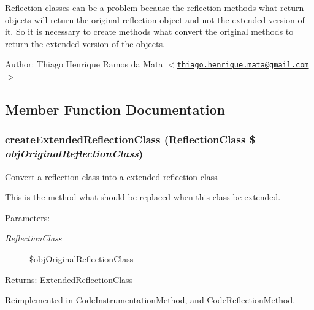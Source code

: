 Reflection classes can be a problem because the reflection methods what return objects will return the original reflection object and not the extended version of it. So it is necessary to create methods what convert the original methods to return the extended version of the objects.

\begin{Desc}
\item[Author:]Thiago Henrique Ramos da Mata $<$\href{mailto:thiago.henrique.mata@gmail.com}{\tt thiago.henrique.mata@gmail.com}$>$ \end{Desc}


\subsection{Member Function Documentation}
\hypertarget{class_extended_reflection_method_6b56ec198bc6a5b5a72076e4e7c19e29}{
\subsubsection[{createExtendedReflectionClass}]{\setlength{\rightskip}{0pt plus 5cm}createExtendedReflectionClass (ReflectionClass \$ {\em objOriginalReflectionClass})}}
\label{class_extended_reflection_method_6b56ec198bc6a5b5a72076e4e7c19e29}


Convert a reflection class into a extended reflection class

This is the method what should be replaced when this class be extended.

\begin{Desc}
\item[Parameters:]
\begin{description}
\item[{\em ReflectionClass}]\$objOriginalReflectionClass \end{description}
\end{Desc}
\begin{Desc}
\item[Returns:]\hyperlink{class_extended_reflection_class}{ExtendedReflectionClass} \end{Desc}


Reimplemented in \hyperlink{class_code_instrumentation_method_6b56ec198bc6a5b5a72076e4e7c19e29}{CodeInstrumentationMethod}, and \hyperlink{class_code_reflection_method_6b56ec198bc6a5b5a72076e4e7c19e29}{CodeReflectionMethod}.

